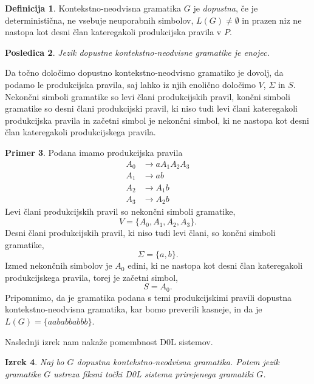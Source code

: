 \documentclass{amsart}
\theoremstyle{definition}
\newtheorem{definicija}{Definicija}[section]
\newtheorem{primer}[definicija]{Primer}
\theoremstyle{plain} %
\newtheorem{izrek}[definicija]{Izrek}
\newtheorem{posledica}[definicija]{Posledica}
\begin{document}
\begin{definicija}
    
    Kontekstno-neodvisna gramatika $G$ je \textit{dopustna}, če je deterministična, ne vsebuje neuporabnih simbolov,
    $ L(G) \neq \emptyset $ in prazen niz ne nastopa kot desni član kateregakoli produkcijska pravila v $ P $.

\end{definicija}

\begin{posledica}
    
    Jezik dopustne kontekstno-neodvisne gramatike je enojec. 

\end{posledica}

Da točno določimo dopustno kontekstno-neodvisno gramatiko je dovolj, da podamo le produkcijska pravila,
saj lahko iz njih enolično določimo $ V $, $ \Sigma $ in $ S $. Nekončni simboli gramatike
so levi člani produkcijskih pravil, končni simboli gramatike so desni člani produkcijski pravil, ki
niso tudi levi člani kateregakoli produkcijska pravila in začetni simbol je nekončni simbol, ki 
ne nastopa kot desni član kateregakoli produkcijskega pravila.

\begin{primer}
    Podana imamo produkcijska pravila
    \begin{align*}
        A_0 &\rightarrow aA_1A_2A_3 \\
        A_1 &\rightarrow ab \\
        A_2 &\rightarrow A_1b \\
        A_3 &\rightarrow A_2b
    \end{align*}
    Levi člani produkcijskih pravil so nekončni simboli gramatike,
    \[
        V = \{ A_0, A_1, A_2, A_3 \}.
    \]
    Desni člani produkcijskih pravil, ki niso tudi levi člani, so končni simboli gramatike,
    \[
        \Sigma = \{ a, b \}.
    \]
    Izmed nekončnih simbolov je $ A_0 $ edini, ki ne nastopa kot desni član kateregakoli
    produkcijskega pravila, torej je začetni simbol,
    \[
        S = A_0.
    \]
    Pripomnimo, da je gramatika podana s temi produkcijskimi pravili dopustna kontekstno-neodvisna
    gramatika, kar bomo preverili kasneje, in da je $ L(G) = \{ aababbabbb \} $.
\end{primer}

Naslednji izrek nam nakaže pomembnost D0L sistemov.

\begin{izrek}

    Naj bo $G$ dopustna kontekstno-neodvisna gramatika.
    Potem jezik gramatike $G$ ustreza fiksni točki D0L sistema prirejenega gramatiki $G$.

\end{izrek}
\end{document}
